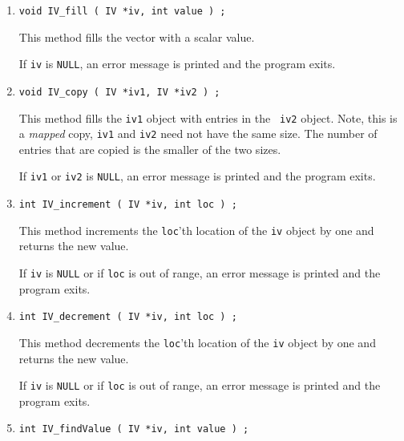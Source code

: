\begin{enumerate}
\item
\begin{verbatim}
void IV_fill ( IV *iv, int value ) ;
\end{verbatim}
This method fills the vector with a scalar value.
\par {}
If {\tt iv} is {\tt NULL},
an error message is printed and the program exits.
\item
\begin{verbatim}
void IV_copy ( IV *iv1, IV *iv2 ) ;
\end{verbatim}
This method fills the {\tt iv1} object with entries in the {\tt
iv2} object.
Note, this is a {\it mapped} copy, {\tt iv1} and {\tt iv2} need not
have the same size.
The number of entries that are copied is the smaller of the two sizes.
\par {}
If {\tt iv1} or {\tt iv2} is {\tt NULL},
an error message is printed and the program exits.
\item
\begin{verbatim}
int IV_increment ( IV *iv, int loc ) ;
\end{verbatim}
This method increments the {\tt loc}'th location 
of the {\tt iv} object by one and returns the new value.
\par {}
If {\tt iv} is {\tt NULL} or if {\tt loc} is out of range,
an error message is printed and the program exits.
\item
\begin{verbatim}
int IV_decrement ( IV *iv, int loc ) ;
\end{verbatim}
This method decrements the {\tt loc}'th location 
of the {\tt iv} object by one and returns the new value.
\par {}
If {\tt iv} is {\tt NULL} or if {\tt loc} is out of range,
an error message is printed and the program exits.
\item
\begin{verbatim}
int IV_findValue ( IV *iv, int value ) ;
\end{verbatim}

\end{enumerate}
